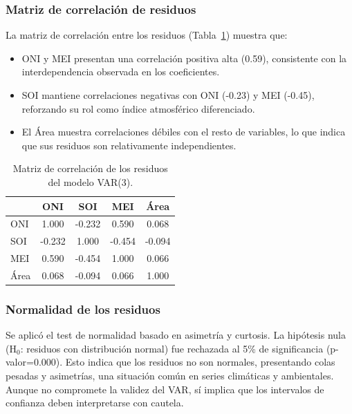 \subsubsection{Matriz de correlación de residuos}
La matriz de correlación entre los residuos (Tabla~\ref{tab:var_corr_resid}) muestra que:

\begin{itemize}
    \item ONI y MEI presentan una correlación positiva alta (0.59), consistente con la interdependencia observada en los coeficientes.
    \item SOI mantiene correlaciones negativas con ONI (-0.23) y MEI (-0.45), reforzando su rol como índice atmosférico diferenciado.
    \item El Área muestra correlaciones débiles con el resto de variables, lo que indica que sus residuos son relativamente independientes.
\end{itemize}


\begin{table}[H]
    \centering
    \caption{Matriz de correlación de los residuos del modelo VAR(3).}
    \label{tab:var_corr_resid}
    \begin{tabular}{lcccc}
        \toprule
               & ONI & SOI & MEI & Área \\
        \midrule
        ONI     & 1.000 & -0.232 &  0.590 &  0.068 \\
        SOI     & -0.232 & 1.000 & -0.454 & -0.094 \\
        MEI     & 0.590 & -0.454 &  1.000 &  0.066 \\
        Área    & 0.068 & -0.094 &  0.066 &  1.000 \\
        \bottomrule
    \end{tabular}
\end{table}

\subsubsection{Normalidad de los residuos}
Se aplicó el test de normalidad basado en asimetría y curtosis. La hipótesis nula (H$_0$: residuos con distribución normal) fue rechazada al 5\% de significancia (p-valor=0.000). Esto indica que los residuos no son normales, presentando colas pesadas y asimetrías, una situación común en series climáticas y ambientales. Aunque no compromete la validez del VAR, sí implica que los intervalos de confianza deben interpretarse con cautela.

